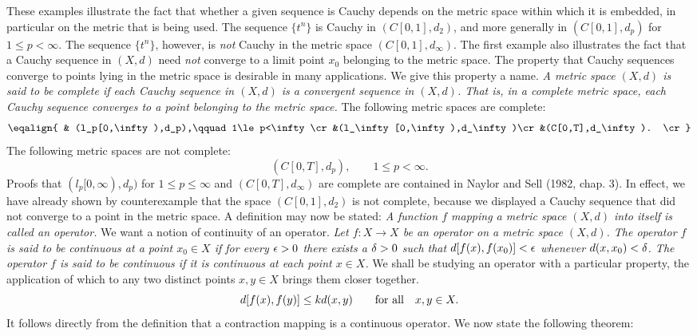 These examples illustrate the fact that whether a given sequence is Cauchy
depends on the metric space within which it is embedded, in particular on the
metric that is being used.  The sequence $\{t^n\}$ is Cauchy in $(C[0,1],d_2)$,
and more generally in $(C[0,1],d_p)$ for $1\le p<\infty$.  The sequence
$\{t^n\}$, however, is {\it not\/} Cauchy in the metric space
$(C[0,1],d_\infty)$.  The first example also illustrates the fact that a Cauchy
sequence in $(X,d)$ need {\it not\/} converge to a limit point $x_0$ belonging
to the metric space.  The property that Cauchy sequences converge to points
lying in the metric space is desirable in many applications.  We give this
property a name.
\medskip
 {\it A metric space $(X,d)$ is said to be complete
if each Cauchy sequence in $(X,d)$ is a convergent sequence in $(X,d)$.  That
is, in a complete metric space, each Cauchy sequence converges to a point
belonging to the metric space.} \enddefinition
\medskip
The following metric spaces are complete:
$$\eqalign{ & (l_p[0,\infty),d_p),\qquad 1\le p<\infty\cr
&(l_\infty [0,\infty),d_\infty)\cr
&(C[0,T],d_\infty). \cr}$$
The following metric spaces are not complete:
$$(C[0,T],d_p),\qquad 1\le p<\infty.$$
\medskip
Proofs that $(l_p[0,\infty),d_p)$ for $1\le p\le \infty$ and
$(C[0,T],d_\infty)$ are complete are contained in Naylor and Sell (1982,
chap. 3).  In effect, we have already shown by counterexample that the space
$(C[0,1],d_2)$ is not complete, because we displayed a Cauchy sequence that did
not converge to a point in the metric space.  A definition may now be stated:
\medskip
 {\it A function $f$ mapping a metric space $(X,d)$
into itself is called an operator.}\enddefinition
\medskip
We want a notion of continuity of an operator.
\medskip
 {\it Let $f:X\to X$ be an operator on a metric
space $(X,d)$.  The operator $f$ is said to be continuous at a point $x_0\in X$
if for every ${\epsilon}>0$ there exists a ${\delta} >0$ such that $d[f(x),f(x_0)]<{\epsilon}$
whenever $d(x,x_0)<{\delta}$.  The operator $f$ is said to be continuous if it is
continuous at each point $x\in X$.}
\enddefinition
\medskip
We shall be studying an operator with a particular property,
the application of which to
any two distinct points $x,y\in X$ brings them closer together.
\medskip
$$d[f(x),f(y)]\le kd(x,y)\qquad{\rm for\ all}\quad x,y\in X.$$
It follows directly from the definition that a contraction mapping is a
continuous operator.
\medskip
We now state the following theorem:

